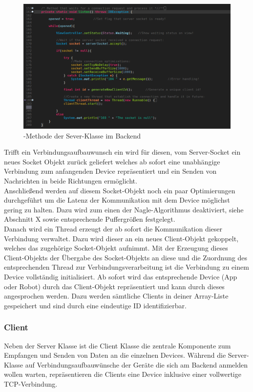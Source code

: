 \begin{figure}[ht]
	\centering
	\includegraphics[width=1.0\textwidth]{images/implementation/SeverListenMethod.png}
	\caption[-Methode der Sever-Klasse im Backend]{-Methode der Sever-Klasse im Backend}
	\label{fig:ev3system}
\end{figure}
Trifft ein Verbindungsaufbauwunsch ein wird für diesen, vom Server-Socket ein neues Socket Objekt zurück geliefert welches 
ab sofort eine unabhängige Verbindung zum anfangenden Device repräsentiert und ein Senden von Nachrichten in beide Richtungen 
ermöglicht.\\
Anschließend werden auf diesem Socket-Objekt noch ein paar Optimierungen durchgeführt um die Latenz der Kommunikation mit dem
Device möglichst gering zu halten. Dazu wird zum einen der Nagle-Algorithmus deaktiviert, siehe Abschnitt X sowie entsprechende
Puffergrößen festgelegt. \\
Danach wird ein Thread erzeugt der ab sofort die Kommunikation dieser Verbindung verwaltet. Dazu wird dieser an ein neues Client-Objekt 
gekoppelt, welches das zugehörige Socket-Objekt aufnimmt. Mit der Erzeugung dieses Client-Objekts der Übergabe des Socket-Objekts an diese und
die Zuordnung des entsprechenden Thread zur Verbindungsverarbeitung ist die Verbindung zu einem Device vollständig initialisiert. 
Ab sofort wird das entsprechende Device (App oder Robot) durch das Client-Objekt repräsentiert und kann durch dieses angesprochen werden. Dazu
werden sämtliche Clients in deiner Array-Liste gespeichert und sind durch eine eindeutige ID identifizierbar.
\subsubsection{Client}
Neben der Server Klasse ist die Client Klasse die zentrale Komponente zum Empfangen und Senden von Daten an die einzelnen Devices.
Während die Server-Klasse auf Verbindungsaufbauwünsche der Geräte die sich am Backend anmelden wollen warten, repräsentieren die Clients
eine Device inklusive einer vollwertige TCP-Verbindung.  
